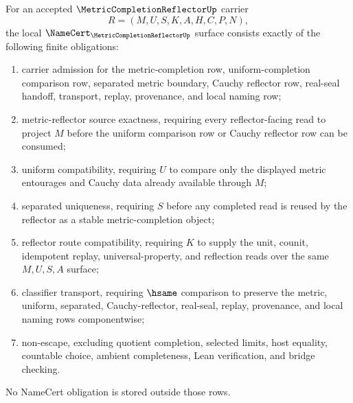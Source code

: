 \begin{theorem}
\label{thm:metric-completion-reflector-namecert-obligations}
For an accepted $\MetricCompletionReflectorUp$ carrier
$$
R=(M,U,S,K,A,H,C,P,N),
$$
the local $\NameCert_{\MetricCompletionReflectorUp}$ surface consists exactly of the following finite obligations:
\begin{enumerate}
\item carrier admission for the metric-completion row, uniform-completion comparison row, separated metric boundary, Cauchy reflector row, real-seal handoff, transport, replay, provenance, and local naming row;
\item metric-reflector source exactness, requiring every reflector-facing read to project $M$ before the uniform comparison row or Cauchy reflector row can be consumed;
\item uniform compatibility, requiring $U$ to compare only the displayed metric entourages and Cauchy data already available through $M$;
\item separated uniqueness, requiring $S$ before any completed read is reused by the reflector as a stable metric-completion object;
\item reflector route compatibility, requiring $K$ to supply the unit, counit, idempotent replay, universal-property, and reflection reads over the same $M,U,S,A$ surface;
\item classifier transport, requiring $\hsame$ comparison to preserve the metric, uniform, separated, Cauchy-reflector, real-seal, replay, provenance, and local naming rows componentwise;
\item non-escape, excluding quotient completion, selected limits, host equality, countable choice, ambient completeness, Lean verification, and bridge checking.
\end{enumerate}
No NameCert obligation is stored outside those rows.
\end{theorem}
